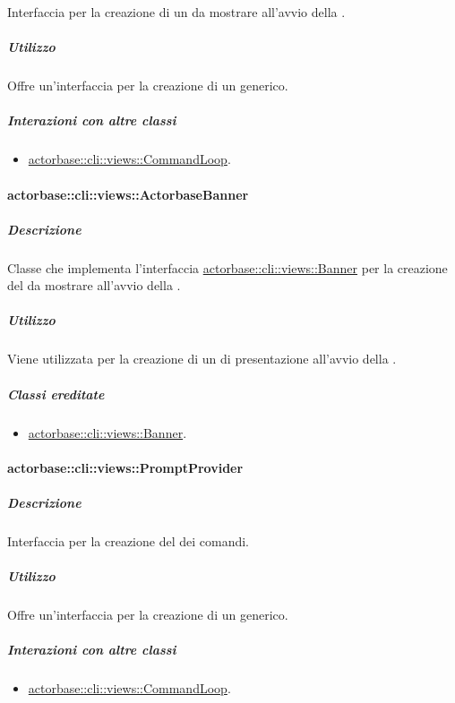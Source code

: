\documentclass{scalatekids-article}
\begin{document}
Interfaccia per la creazione di un  da mostrare all'avvio della
.

\subparagraph{Utilizzo}

Offre un'interfaccia per la creazione di un  generico.

\subparagraph{Interazioni con altre classi}

\begin{itemize}
\item \hyperref[sec:actorbase::cli::views::CommandLoop]{actorbase::cli::views::CommandLoop}.
\end{itemize}

\paragraph{actorbase::cli::views::ActorbaseBanner}
\label{sec:actorbase::cli::views::ActorbaseBanner}

\subparagraph{Descrizione}

Classe che implementa l'interfaccia \hyperref[sec:actorbase::cli::views::Banner]{actorbase::cli::views::Banner} per la
creazione del  da mostrare all'avvio della .

\subparagraph{Utilizzo}

Viene utilizzata per la creazione di un  di presentazione
all'avvio della .

\subparagraph{Classi ereditate}

\begin{itemize}
\item \hyperref[sec:actorbase::cli::views::Banner]{actorbase::cli::views::Banner}.
\end{itemize}

\paragraph{actorbase::cli::views::PromptProvider}
\label{sec:actorbase::cli::views::PromptProvider}

\subparagraph{Descrizione}

Interfaccia per la creazione del  dei comandi.

\subparagraph{Utilizzo}

Offre un'interfaccia per la creazione di un  generico.

\subparagraph{Interazioni con altre classi}

\begin{itemize}
\item \hyperref[sec:actorbase::cli::views::CommandLoop]{actorbase::cli::views::CommandLoop}.
\end{itemize}
\end{document}
